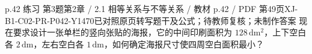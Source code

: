 \par\noindent\begin{minipage}{\linewidth}
\begin{bankitem}{p.42 练习 第3题}{第2章 / 2.1 相等关系与不等关系 / 教材 p.42 / PDF 第49页}{XJ-B1-C02-PR-P042-Y1470}{已对照原页转写题干及公式；待教师复核；未制作答案}
现在要求设计一张单栏的竖向张贴的海报，它的中间印刷面积为 $128\,\mathrm{dm^2}$，上下空白各 $2\,\mathrm{dm}$，左右空白各 $1\,\mathrm{dm}$，如何确定海报尺寸使四周空白面积最小？
\end{bankitem}
\end{minipage}\par\medskip
